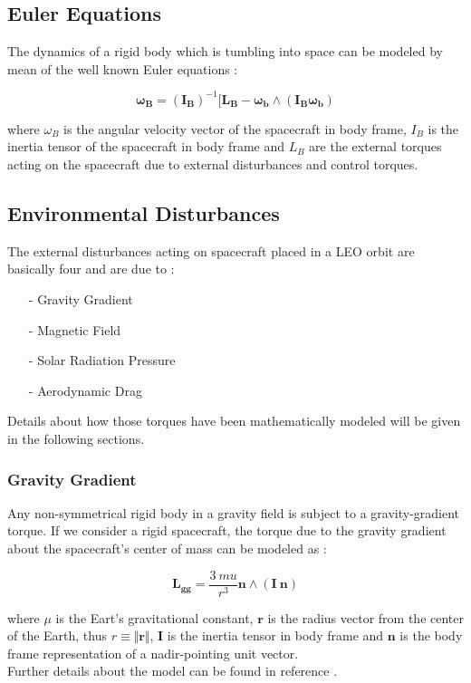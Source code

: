 \subsection{Euler Equations}
The dynamics of a rigid body which is tumbling into space can be modeled by mean of the well known Euler equations : 

\begin{equation}
  \mathbf{\omega_B} = \mathbf{(I_B)}^{-1} [\mathbf{L_B} - \mathbf{\omega_b}  \wedge (\mathbf{I_B} \mathbf{\omega_b})
\end{equation}

where \textbf{$\omega_B$} is the angular velocity vector of the spacecraft in body frame, \textbf{$I_B$} is the inertia tensor of the spacecraft in body frame and \textbf{$L_B$} are the external torques acting on the spacecraft due to  external disturbances and control torques.

\subsection{Environmental Disturbances} \label{sec:disturbances}
The external disturbances acting on spacecraft placed in a LEO orbit are basically four and are due to :

\begin{itemize}
  \item[-] Gravity Gradient
  \item[-] Magnetic Field 
  \item[-] Solar Radiation Pressure
  \item[-] Aerodynamic Drag
\end{itemize}

Details about how those torques have been mathematically modeled will be given in the following sections.

\subsubsection{Gravity Gradient}
Any non-symmetrical rigid body in a gravity field is subject to a gravity-gradient torque.
If we consider a rigid spacecraft, the torque due to the gravity gradient about the spacecraft's center of mass can be modeled as :

\begin{equation}
 \mathbf{L_{gg}} = \frac{3 \ mu}{r^3} \mathbf{n} \wedge (\mathbf{I} \ \mathbf{n})
\end{equation}

where $\mu$ is the Eart's gravitational constant, $\textbf{r}$ is the radius vector from the center of the Earth, thus $r \equiv \Vert{\textbf{r}}\Vert$, $\textbf{I}$ is the inertia tensor in body frame and $\textbf{n}$ is the body frame representation of a nadir-pointing unit vector.\\
Further details about the model can be found in reference \cite{Markley2014}.

